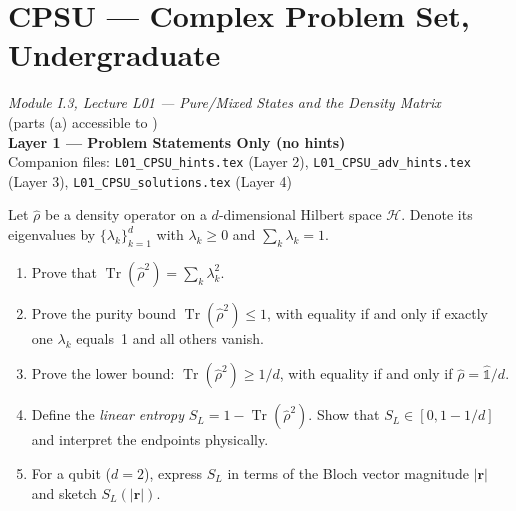 \documentclass[11pt,a4paper]{article}
\begin{document}
\section*{CPSU --- Complex Problem Set, Undergraduate}
\begin{center}
  \textit{Module I.3, Lecture L01 --- Pure/Mixed States and the Density Matrix}\\[4pt]
   (parts (a) accessible to )\\[6pt]
  \textbf{Layer 1 --- Problem Statements Only (no hints)}\\[4pt]
  Companion files: \texttt{L01\_CPSU\_hints.tex} (Layer 2),
  \texttt{L01\_CPSU\_adv\_hints.tex} (Layer 3),
  \texttt{L01\_CPSU\_solutions.tex} (Layer 4)
\end{center}


\bigskip

\begin{tcolorbox}[ugprobbox, title={Problem 1 --- Spectral Decomposition and Purity Bound}]
\label{prob:CPSU.1}

Let $\hat{\rho}$ be a density operator on a $d$-dimensional Hilbert space $\mathcal{H}$.
Denote its eigenvalues by $\{\lambda_k\}_{k=1}^d$ with $\lambda_k\ge 0$
and $\sum_k\lambda_k=1$.

\begin{enumerate}[label=(\alph*), itemsep=8pt]
  \item Prove that $\operatorname{Tr}(\hat{\rho}^2)=\sum_k\lambda_k^2$.
  \item Prove the purity bound $\operatorname{Tr}(\hat{\rho}^2)\le 1$, with equality
        if and only if exactly one $\lambda_k$ equals~1 and all others vanish.
  \item Prove the lower bound: $\operatorname{Tr}(\hat{\rho}^2)\ge 1/d$,
        with equality if and only if $\hat{\rho}=\hat{\mathbb{1}}/d$.
  \item Define the \emph{linear entropy} $S_L=1-\operatorname{Tr}(\hat{\rho}^2)$.
        Show that $S_L\in[0,1-1/d]$ and interpret the endpoints physically.
  \item For a qubit ($d=2$), express $S_L$ in terms of the Bloch vector magnitude
        $|\mathbf{r}|$ and sketch $S_L(|\mathbf{r}|)$.
\end{enumerate}
\end{tcolorbox}
\end{document}
